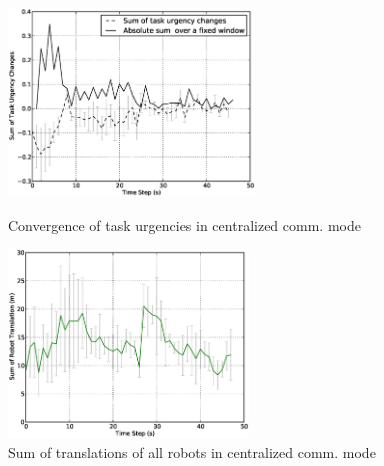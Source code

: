 \documentclass[letterpaper, 10 pt, conference]{ieeeconf}  %
\begin{document}
\begin{figure}
\begin{minipage}[t]{0.5\linewidth}
\centering
\includegraphics[height=5cm, angle=0]{images/global/TaskUrgencyConvergence-step2-th-p1.eps}
\caption{\small Convergence of task urgencies in centralized comm. mode}
\label{fig:urgency-convergence} %
\end{minipage}
\hspace{0.5cm}
\begin{minipage}[t]{0.5\linewidth}
\centering
\includegraphics[height=5cm, angle=0]{images/global/DeltaTranslationStat.eps}
\caption{\small Sum of translations of all robots in centralized comm. mode }
\label{fig:translation-stat} %
\end{minipage}
\end{figure}
\end{document}
